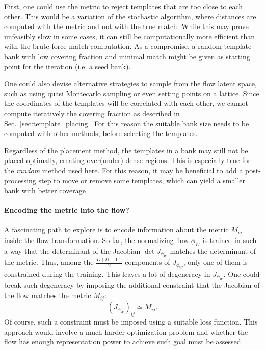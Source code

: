 \documentclass[twocolumn,showpacs,preprintnumbers,nofootinbib,prd,
superscriptaddress,10pt]{revtex4-2}
\begin{document}
First, one could use the metric to reject templates that are too close to each other. This would be a variation of the stochastic algorithm, where distances are computed with the metric and not with the true match. While this may prove unfeasibly slow in some cases, it can still be computationally more efficient than with the brute force match computation. As a compromise, a random template bank with low covering fraction and minimal match might be given as starting point for the iteration (i.e. a seed bank).

One could also devise alternative strategies to sample from the flow latent space, such as using quasi Montecarlo sampling or even setting points on a lattice.
Since the coordinates of the templates will be correlated with each other, we cannot compute iteratively the covering fraction as described in Sec.~\ref{sec:template_placing}. For this reason the suitable bank size needs to be computed with other methods, before selecting the templates.

Regardless of the placement method, the templates in a bank may still not be placed optimally, creating over(under)-dense regions. This is especially true for the {\it random} method used here. For this reason, it may be beneficial to add a post-processing step to move or remove some templates, which can yield a smaller bank with better coverage \cite{Indik:2017vqq}.

\paragraph{Encoding the metric into the flow?}

A fascinating path to explore is to encode information about the metric $M_{ij}$ inside the flow transformation.
So far, the normalizing flow $\phi_W$ is trained in such a way that the determinant of the Jacobian $\det J_{\phi_W}$ matches the determinant of the metric.
Thus, among the $\frac{D(D-1)}{2}$ components of $J_{\phi_W}$, only one of them is constrained during the training. This leaves a lot of degeneracy in $J_{\phi_W}$.
One could break such degeneracy by imposing the additional constraint that the Jacobian of the flow matches the metric $M_{ij}$:
\begin{equation}
	(J_{\phi_W})_{ij} \simeq M_{ij}.
\end{equation}
Of course, such a constraint must be imposed using a suitable loss function.
This approach would involve a much harder optimization problem and whether the flow has enough representation power to achieve such goal must be assessed.
\end{document}
